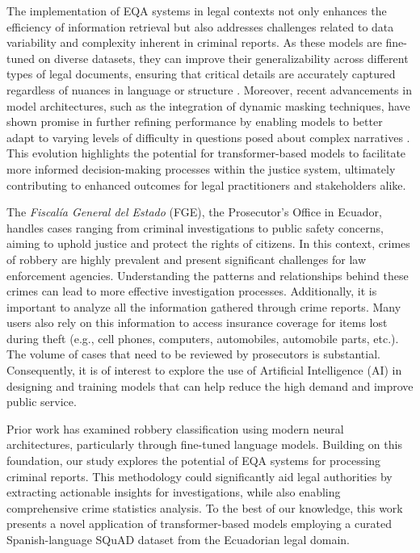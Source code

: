 \documentclass[runningheads]{llncs}
\begin{document}
The implementation of EQA systems in legal contexts not only enhances
the efficiency of information retrieval but also addresses challenges
related to data variability and complexity inherent in criminal
reports. As these models are fine-tuned on diverse datasets, they can
improve their generalizability across different types of legal
documents, ensuring that critical details are accurately captured
regardless of nuances in language or structure
\cite{jha2022extractive}. Moreover, recent advancements in model
architectures, such as the integration of dynamic masking techniques,
have shown promise in further refining performance by enabling models
to better adapt to varying levels of difficulty in questions posed
about complex narratives \cite{Pearce_Zhan_Komanduri_Zhan_2021}. This
evolution highlights the potential for transformer-based models to
facilitate more informed decision-making processes within the justice
system, ultimately contributing to enhanced outcomes for legal
practitioners and stakeholders alike.

The \textit{Fiscalía General del Estado} (FGE), the Prosecutor’s
Office in Ecuador, handles cases ranging from criminal investigations
to public safety concerns, aiming to uphold justice and protect the
rights of citizens. In this context, crimes of robbery are highly
prevalent and present significant challenges for law enforcement
agencies. Understanding the patterns and relationships behind these
crimes can lead to more effective investigation processes. Additionally,
it is important to analyze all the information gathered through crime
reports. Many users also rely on this information to access insurance
coverage for items lost during theft (e.g., cell phones, computers,
automobiles, automobile parts, etc.). The volume of cases that need to
be reviewed by prosecutors is substantial. Consequently, it is of
interest to explore the use of Artificial Intelligence (AI) in
designing and training models that can help reduce the high demand and
improve public service.

Prior work has examined robbery classification using modern neural
architectures, particularly through fine-tuned language
models. Building on this foundation, our study explores the potential
of EQA systems for processing criminal reports. This methodology could
significantly aid legal authorities by extracting actionable insights
for investigations, while also enabling comprehensive crime statistics
analysis. To the best of our knowledge, this work presents a novel
application of transformer-based models employing a curated
Spanish-language SQuAD dataset from the Ecuadorian legal domain.
\end{document}
